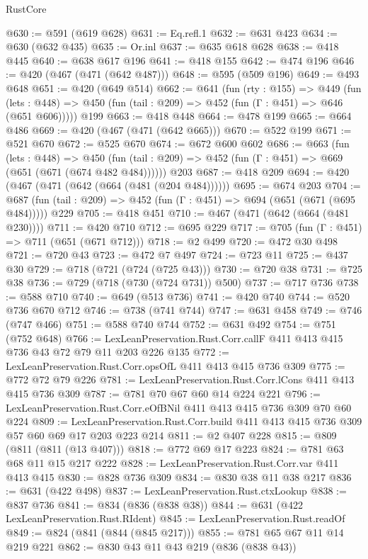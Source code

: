 \begin{lexlean}{RustCore}
\begin{coremodule}
@630 := @591 (@619 @628)
@631 := Eq.refl.{1}
@632 := @631 @423
@634 := @630 (@632 @435)
@635 := Or.inl
@637 := @635 @618 @628
@638 := @418 @445
@640 := @638 @617 @196
@641 := @418 @155
@642 := @474 @196
@646 := @420 (@467 (@471 (@642 @487)))
@648 := @595 (@509 @196)
@649 := @493 @648
@651 := @420 (@649 @514)
@662 := @641
    (fun (rty : @155) =>
    @449
      (fun (lets : @448) => @450 (fun (tail : @209) => @452 (fun (Γ : @451) => @646 (@651 @606)))))
    @199
@663 := @418 @448
@664 := @478 @199
@665 := @664 @486
@669 := @420 (@467 (@471 (@642 @665)))
@670 := @522 @199
@671 := @521 @670
@672 := @525 @670
@674 := @672 @600 @602
@686 := @663
    (fun (lets : @448) =>
    @450 (fun (tail : @209) => @452 (fun (Γ : @451) => @669 (@651 (@671 (@674 @482 @484))))))
    @203
@687 := @418 @209
@694 := @420 (@467 (@471 (@642 (@664 (@481 (@204 @484))))))
@695 := @674 @203
@704 := @687 (fun (tail : @209) => @452 (fun (Γ : @451) => @694 (@651 (@671 (@695 @484))))) @229
@705 := @418 @451
@710 := @467 (@471 (@642 (@664 (@481 @230))))
@711 := @420 @710
@712 := @695 @229
@717 := @705 (fun (Γ : @451) => @711 (@651 (@671 @712)))
@718 := @2 @499
@720 := @472 @30 @498
@721 := @720 @43
@723 := @472 @7 @497
@724 := @723 @11
@725 := @437 @30
@729 := @718 (@721 (@724 (@725 @43)))
@730 := @720 @38
@731 := @725 @38
@736 := @729 (@718 (@730 (@724 @731)) @500)
@737 := @717 @736
@738 := @588 @710
@740 := @649 (@513 @736)
@741 := @420 @740
@744 := @520 @736 @670 @712
@746 := @738 (@741 @744)
@747 := @631 @458
@749 := @746 (@747 @466)
@751 := @588 @740 @744
@752 := @631 @492
@754 := @751 (@752 @648)
@766 := LexLeanPreservation.Rust.Corr.callF @411 @413 @415 @736 @43 @72 @79 @11 @203 @226 @135
@772 := LexLeanPreservation.Rust.Corr.opsOfL @411 @413 @415 @736 @309
@775 := @772 @72 @79 @226
@781 := LexLeanPreservation.Rust.Corr.lCons @411 @413 @415 @736 @309
@787 := @781 @70 @67 @60 @14 @224 @221
@796 := LexLeanPreservation.Rust.Corr.eOfBNil @411 @413 @415 @736 @309 @70 @60 @224
@809 := LexLeanPreservation.Rust.Corr.build @411 @413 @415 @736 @309 @57 @60 @69 @17 @203 @223 @214
@811 := @2 @407 @228
@815 := @809 (@811 (@811 (@13 @407)))
@818 := @772 @69 @17 @223
@824 := @781 @63 @68 @11 @15 @217 @222
@828 := LexLeanPreservation.Rust.Corr.var @411 @413 @415
@830 := @828 @736 @309
@834 := @830 @38 @11 @38 @217
@836 := @631 (@422 @498)
@837 := LexLeanPreservation.Rust.ctxLookup
@838 := @837 @736
@841 := @834 (@836 (@838 @38))
@844 := @631 (@422 LexLeanPreservation.Rust.RIdent)
@845 := LexLeanPreservation.Rust.readOf
@849 := @824 (@841 (@844 (@845 @217)))
@855 := @781 @65 @67 @11 @14 @219 @221
@862 := @830 @43 @11 @43 @219 (@836 (@838 @43))

\end{coremodule}
\end{lexlean}
